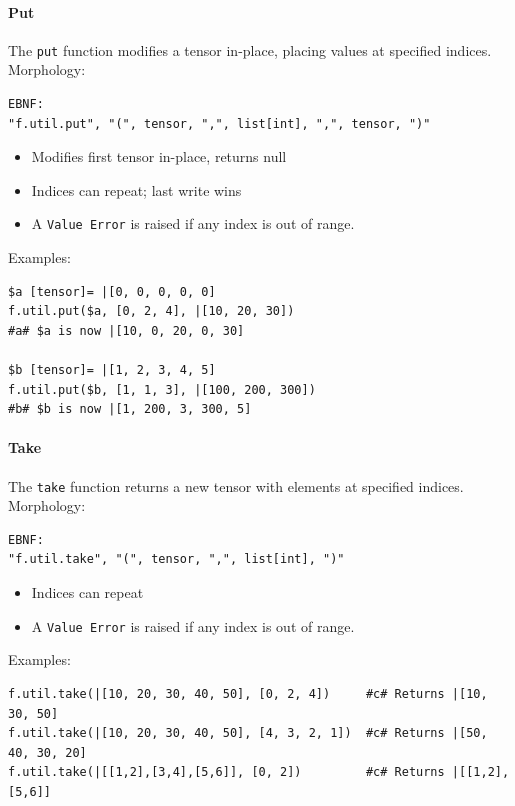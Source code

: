 \paragraph{Put}
The \texttt{put} function modifies a tensor in-place, placing values at specified indices.\\
Morphology:
\begin{verbatim}
EBNF:
"f.util.put", "(", tensor, ",", list[int], ",", tensor, ")"
\end{verbatim}
\begin{itemize}
\item Modifies first tensor in-place, returns null
\item Indices can repeat; last write wins
\item A \texttt{Value Error} is raised if any index is out of range.
\end{itemize}
Examples:
\begin{verbatim}
$a [tensor]= |[0, 0, 0, 0, 0]
f.util.put($a, [0, 2, 4], |[10, 20, 30])
#a# $a is now |[10, 0, 20, 0, 30]

$b [tensor]= |[1, 2, 3, 4, 5]
f.util.put($b, [1, 1, 3], |[100, 200, 300])
#b# $b is now |[1, 200, 3, 300, 5]
\end{verbatim}

\paragraph{Take}
The \texttt{take} function returns a new tensor with elements at specified indices.\\
Morphology:
\begin{verbatim}
EBNF:
"f.util.take", "(", tensor, ",", list[int], ")"
\end{verbatim}
\begin{itemize}
\item Indices can repeat
\item A \texttt{Value Error} is raised if any index is out of range.
\end{itemize}
Examples:
\begin{verbatim}
f.util.take(|[10, 20, 30, 40, 50], [0, 2, 4])     #c# Returns |[10, 30, 50]
f.util.take(|[10, 20, 30, 40, 50], [4, 3, 2, 1])  #c# Returns |[50, 40, 30, 20]
f.util.take(|[[1,2],[3,4],[5,6]], [0, 2])         #c# Returns |[[1,2],[5,6]]
\end{verbatim}

